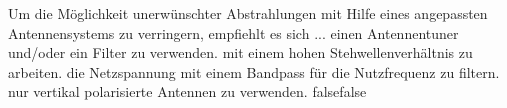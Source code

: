     {Um die Möglichkeit unerwünschter Abstrahlungen mit Hilfe eines angepassten Antennensystems zu verringern, empfiehlt es sich ...}
    {einen Antennentuner und/oder ein Filter zu verwenden.}
    {mit einem hohen Stehwellenverhältnis zu arbeiten.}
    {die Netzspannung mit einem Bandpass für die Nutzfrequenz zu filtern.}
    {nur vertikal polarisierte Antennen zu verwenden.}
    {false}{false}